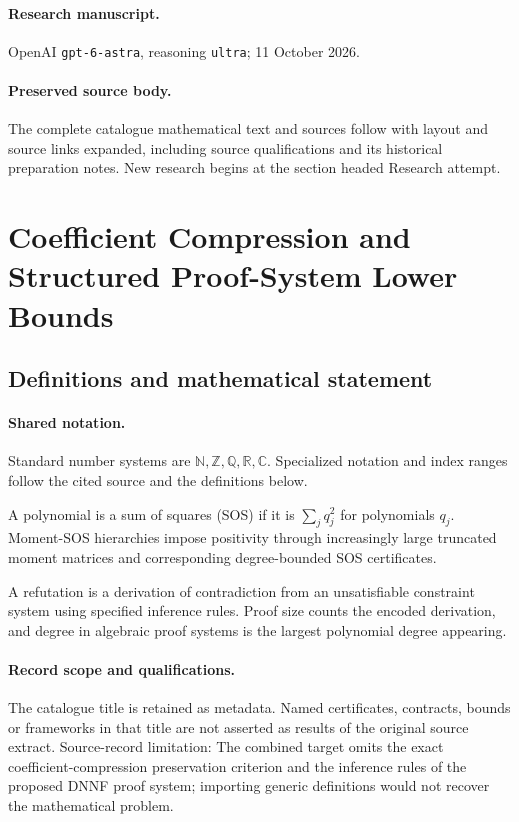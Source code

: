 \documentclass[11pt]{article}
\begin{document}
\paragraph{Research manuscript.} OpenAI \texttt{gpt-6-astra}, reasoning \texttt{ultra}; 11 October 2026.
\paragraph{Preserved source body.} The complete catalogue mathematical text and sources follow with layout and source links expanded, including source qualifications and its historical preparation notes. New research begins at the section headed Research attempt.

\section{Coefficient Compression and Structured Proof-System Lower Bounds}\label{statement}

\subsection{Definitions and mathematical statement}

\paragraph{Shared notation.}Standard number systems are $\mathbb N,\mathbb Z,\mathbb Q,\mathbb R,\mathbb C$. Specialized notation and index ranges follow the cited source and the definitions below.


A polynomial is a sum of squares (SOS) if it is $\sum_j q_j^2$ for polynomials $q_j$. Moment-SOS hierarchies impose positivity through increasingly large truncated moment matrices and corresponding degree-bounded SOS certificates.

A refutation is a derivation of contradiction from an unsatisfiable constraint system using specified inference rules. Proof size counts the encoded derivation, and degree in algebraic proof systems is the largest polynomial degree appearing.
\paragraph{Record scope and qualifications.}
The catalogue title is retained as metadata. Named certificates, contracts, bounds or frameworks in that title are not asserted as results of the original source extract.
Source-record limitation: The combined target omits the exact coefficient-compression preservation criterion and the inference rules of the proposed DNNF proof system; importing generic definitions would not recover the mathematical problem.
\end{document}
